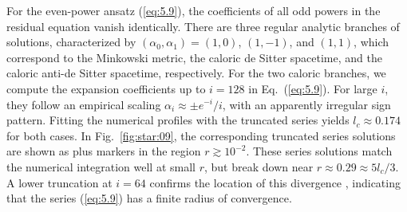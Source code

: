 \documentclass[aps,prd,twocolumn]{revtex4-2}
\begin{document}
For the even-power ansatz (\ref{eq:5.9}), the coefficients of all odd powers in the residual equation vanish identically. There are three regular analytic branches of solutions, characterized by $(\alpha_0,\alpha_1)=(1,0)$, $(1,-1)$, and $(1,1)$, which correspond to the Minkowski metric, the caloric de Sitter spacetime, and the caloric anti-de Sitter spacetime, respectively. For the two caloric branches, we compute the expansion coefficients up to $i=128$ in Eq.~(\ref{eq:5.9}). For large $i$, they follow an empirical scaling $\alpha_i\approx\pm e^{-i}/i$, with an apparently irregular sign pattern. Fitting the numerical profiles with the truncated series yields $l_c\approx0.174$ for both cases. In Fig.~\ref{fig:star:09}, the corresponding truncated series solutions are shown as plus markers in the region $r\gtrsim10^{-2}$. These series solutions match the numerical integration well at small $r$, but break down near $r\approx0.29\approx 5l_c/3$. A lower truncation at $i=64$ confirms the location of this divergence \cite{NotShown}, indicating that the series (\ref{eq:5.9}) has a finite radius of convergence.
\end{document}
